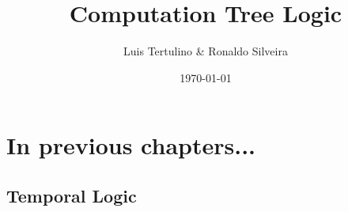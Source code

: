 \documentclass{beamer}
\title[presentationTemplate]{Computation Tree Logic}
\author{Luis Tertulino \& Ronaldo Silveira}
\date{\today}
\begin{document}
\begin{frame}
	\titlepage
\end{frame}

\begin{frame}
\tableofcontents
\end{frame}

\section{In previous chapters...}
\subsection{Temporal Logic}
















\end{document}
